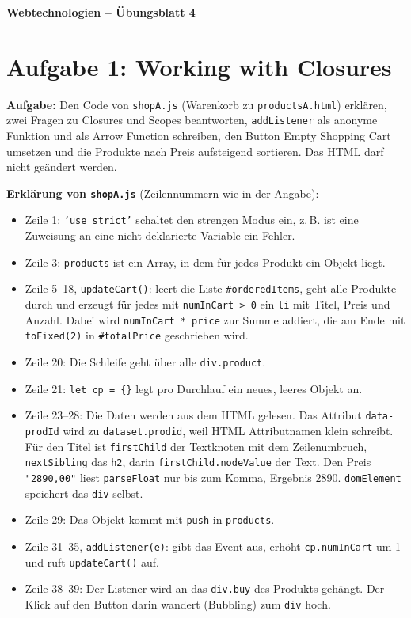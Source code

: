 \documentclass[11pt,a4paper]{article}
\begin{document}
\begin{center}
  {\Large\textbf{Webtechnologien -- Übungsblatt 4}}
\end{center}
\section*{Aufgabe 1: Working with Closures}
\textbf{Aufgabe:} Den Code von \texttt{shopA.js} (Warenkorb zu
\texttt{productsA.html}) erklären, zwei Fragen zu Closures und Scopes
beantworten, \texttt{addListener} als anonyme Funktion und als Arrow
Function schreiben, den Button \glqq Empty Shopping Cart\grqq{} umsetzen und
die Produkte nach Preis aufsteigend sortieren. Das HTML darf nicht
geändert werden.

\medskip
\textbf{Erklärung von \texttt{shopA.js}} (Zeilennummern wie in der
Angabe):
\begin{itemize}
  \item Zeile 1: \texttt{'use strict'} schaltet den strengen Modus ein,
    z.\,B. ist eine Zuweisung an eine nicht deklarierte Variable ein Fehler.
  \item Zeile 3: \texttt{products} ist ein Array, in dem für jedes Produkt
    ein Objekt liegt.
  \item Zeile 5--18, \texttt{updateCart()}: leert die Liste
    \texttt{\#orderedItems}, geht alle Produkte durch und erzeugt für jedes
    mit \texttt{numInCart > 0} ein \texttt{li} mit Titel, Preis und Anzahl.
    Dabei wird \texttt{numInCart * price} zur Summe addiert, die am Ende mit
    \texttt{toFixed(2)} in \texttt{\#totalPrice} geschrieben wird.
  \item Zeile 20: Die Schleife geht über alle \texttt{div.product}.
  \item Zeile 21: \texttt{let cp = \{\}} legt pro Durchlauf ein neues, leeres
    Objekt an.
  \item Zeile 23--28: Die Daten werden aus dem HTML gelesen. Das Attribut
    \texttt{data-prodId} wird zu \texttt{dataset.prodid}, weil HTML
    Attributnamen klein schreibt. Für den Titel ist \texttt{firstChild}
    der Textknoten mit dem Zeilenumbruch, \texttt{nextSibling} das
    \texttt{h2}, darin \texttt{firstChild.}\allowbreak\texttt{nodeValue}
    der Text. Den Preis \texttt{"2890,00"} liest \texttt{parseFloat} nur
    bis zum Komma, Ergebnis 2890.
    \texttt{domElement} speichert das \texttt{div} selbst.
  \item Zeile 29: Das Objekt kommt mit \texttt{push} in \texttt{products}.
  \item Zeile 31--35, \texttt{addListener(e)}: gibt das Event aus, erhöht
    \texttt{cp.numInCart} um 1 und ruft \texttt{updateCart()} auf.
  \item Zeile 38--39: Der Listener wird an das \texttt{div.buy} des Produkts
    gehängt. Der Klick auf den Button darin wandert (Bubbling) zum
    \texttt{div} hoch.
\end{itemize}
\end{document}
